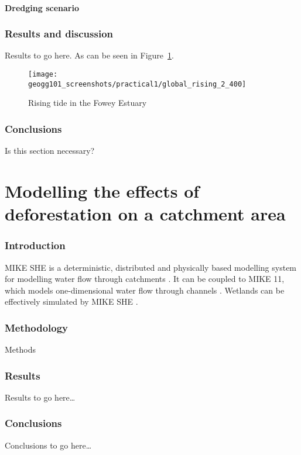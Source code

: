 \documentclass{article}
\begin{document}
\subsection{Dredging scenario}

\section{Results and discussion}
Results to go here. As can be seen in Figure~\ref{fig:rising_tide}.


\begin{figure}[hbp]
    \centering
    \texttt{[image: geogg101\_screenshots/practical1/global\_rising\_2\_400]}
    \caption{Rising tide in the Fowey Estuary}
    \label{fig:rising_tide}
\end{figure}

\section{Conclusions}
Is this section necessary?

\printbibliography[filter=practical1]

\newpage
\setcounter{section}{0}

\part*{Modelling the effects of deforestation on a catchment area}

\section{Introduction}
MIKE SHE is a deterministic, distributed and physically based modelling system for modelling water flow through catchments \parencite{refshaard1995mike}. It can be coupled to MIKE 11, which models one-dimensional water flow through channels \parencite{havno1995mike}. Wetlands can be effectively simulated by MIKE SHE \parencite{thompson2004simulation}. 

\section{Methodology}
Methods

\section{Results}
Results to go here\ldots

\section{Conclusions}
Conclusions to go here\ldots

\printbibliography[filter=practical2]
\end{document}
